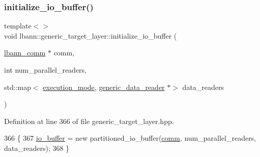 \subsubsection{\texorpdfstring{initialize\+\_\+io\+\_\+buffer()}{initialize\_io\_buffer()}\hspace{0.1cm}{\footnotesize\ttfamily [2/3]}}
{\footnotesize\ttfamily template$<$$>$ \\
void lbann\+::generic\+\_\+target\+\_\+layer\+::initialize\+\_\+io\+\_\+buffer (\begin{DoxyParamCaption}\item[{\hyperlink{classlbann_1_1lbann__comm}{lbann\+\_\+comm} $\ast$}]{comm,  }\item[{int}]{num\+\_\+parallel\+\_\+readers,  }\item[{std\+::map$<$ \hyperlink{base_8hpp_a2781a159088df64ed7d47cc91c4dc0a8}{execution\+\_\+mode}, \hyperlink{classlbann_1_1generic__data__reader}{generic\+\_\+data\+\_\+reader} $\ast$$>$}]{data\+\_\+readers }\end{DoxyParamCaption})\hspace{0.3cm}{\ttfamily [inline]}}



Definition at line 366 of file generic\+\_\+target\+\_\+layer.\+hpp.


\begin{DoxyCode}
366                                                                                                            
                                                                                          \{
367   \hyperlink{classlbann_1_1generic__target__layer_a8da650b94f50cc63fc90cd792fa50c3f}{io\_buffer} = \textcolor{keyword}{new} partitioned\_io\_buffer(\hyperlink{file__io_8cpp_ab048c6f9fcbcfaa57ce68b00263dbebe}{comm}, num\_parallel\_readers, data\_readers);
368 \}
\end{DoxyCode}
\mbox{\label{classlbann_1_1generic__target__layer_a01a04bc2f6e6440082a1255b0de32d95}} 
